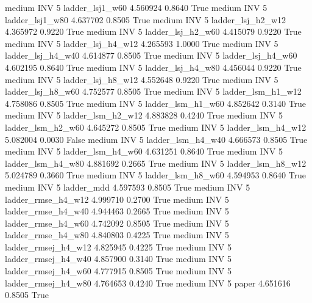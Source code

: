     medium      INV                 5     ladder_lsj1_w60   4.560924      0.8640    True
    medium      INV                 5     ladder_lsj1_w80   4.637702      0.8505    True
    medium      INV                 5   ladder_lsj_h2_w12   4.365972      0.9220    True
    medium      INV                 5   ladder_lsj_h2_w60   4.415079      0.9220    True
    medium      INV                 5   ladder_lsj_h4_w12   4.265593      1.0000    True
    medium      INV                 5   ladder_lsj_h4_w40   4.614877      0.8505    True
    medium      INV                 5   ladder_lsj_h4_w60   4.602195      0.8640    True
    medium      INV                 5   ladder_lsj_h4_w80   4.456044      0.9220    True
    medium      INV                 5   ladder_lsj_h8_w12   4.552648      0.9220    True
    medium      INV                 5   ladder_lsj_h8_w60   4.752577      0.8505    True
    medium      INV                 5   ladder_lsm_h1_w12   4.758086      0.8505    True
    medium      INV                 5   ladder_lsm_h1_w60   4.852642      0.3140    True
    medium      INV                 5   ladder_lsm_h2_w12   4.883828      0.4240    True
    medium      INV                 5   ladder_lsm_h2_w60   4.645272      0.8505    True
    medium      INV                 5   ladder_lsm_h4_w12   5.082004      0.0030   False
    medium      INV                 5   ladder_lsm_h4_w40   4.666573      0.8505    True
    medium      INV                 5   ladder_lsm_h4_w60   4.631251      0.8640    True
    medium      INV                 5   ladder_lsm_h4_w80   4.881692      0.2665    True
    medium      INV                 5   ladder_lsm_h8_w12   5.024789      0.3660    True
    medium      INV                 5   ladder_lsm_h8_w60   4.594953      0.8640    True
    medium      INV                 5          ladder_mdd   4.597593      0.8505    True
    medium      INV                 5  ladder_rmse_h4_w12   4.999710      0.2700    True
    medium      INV                 5  ladder_rmse_h4_w40   4.944463      0.2665    True
    medium      INV                 5  ladder_rmse_h4_w60   4.742092      0.8505    True
    medium      INV                 5  ladder_rmse_h4_w80   4.840803      0.4225    True
    medium      INV                 5 ladder_rmsej_h4_w12   4.825945      0.4225    True
    medium      INV                 5 ladder_rmsej_h4_w40   4.857900      0.3140    True
    medium      INV                 5 ladder_rmsej_h4_w60   4.777915      0.8505    True
    medium      INV                 5 ladder_rmsej_h4_w80   4.764653      0.4240    True
    medium      INV                 5               paper   4.651616      0.8505    True
